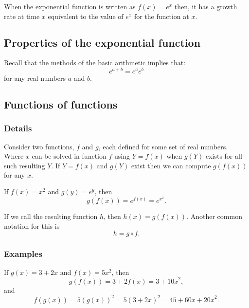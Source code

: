 \documentclass[12pt,a4paper]{article}
\theoremstyle{regla}
\theoremstyle{remark}
\theoremstyle{definition}
\theoremstyle{nonumberbreak}
\begin{document}
When the exponential function is written as $f(x)=e^x$ then, it has a growth rate at time $x$ equivalent to the value of $e^x$ for the function at $x$.



\subsection{Properties of the exponential function}
\begin{fbox}
\begin{minipage}{0.97\textwidth}
Recall that the methods of the basic arithmetic implies that:
$$
e^{a+b} = e^a e^b
$$ for any real numbers $a$ and $b$.
\end{minipage}
\end{fbox}

\subsection{Functions of functions}
\subsubsection{Details}
Consider two functions, $f$ and $g$, each defined for some set of real numbers. Where $x$ can be solved in function $f$ using $Y = f(x)$ when
$g(Y)$ exists for all such resulting $Y$. If $Y = f(x)$ and $g(Y)$ exist then we can compute $g(f(x))$ for any $x$. 

If $f(x) = {x}^2$ and $g(y)= {e}^y$, then
$$g(f(x))= {e}^{f(x)} = {e}^{x^2}.$$

If we call the resulting function $h$, then $h(x) = g(f(x))$.
Another common notation for this is
$$ h = g\circ f.$$

\subsubsection{Examples}
\begin{xmpl}
If $g(x)= {3}+ {2}x$ and $f(x) = {5}{x}^2$, then
$$g(f(x)) = {3} +{2} f(x) = {3} +{10x}^2,$$
and
$$f(g(x)) = {5}{(g(x))}^2 = {5}{({3}+{2x})}^2 = {45}+{60x}+{20x}^2.$$
\end{xmpl}
\end{document}
